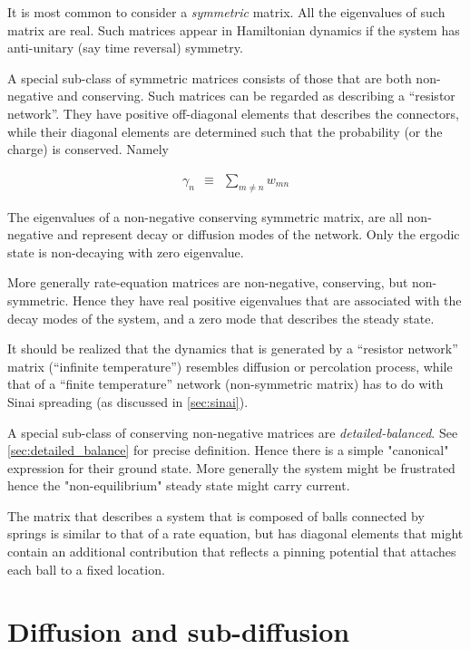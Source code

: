 It is most common to consider a {\em symmetric} matrix. 
All the eigenvalues of such matrix are real. 
Such matrices appear in Hamiltonian dynamics 
if the system has anti-unitary (say time reversal) symmetry.  

A special sub-class of symmetric matrices consists of those 
that are both non-negative and conserving. Such matrices
can be regarded as describing a ``resistor network''.
They have positive off-diagonal elements that describes 
the connectors, while their diagonal elements are determined 
such that the probability (or the charge) is conserved. Namely 

%
\begin{align}\label{eq:zero_sum}
\gamma_n \ \ \equiv \ \ \sum_{m\ne n} w_{mn}
\end{align}
%

The eigenvalues of a non-negative conserving symmetric matrix, 
are all non-negative and represent decay or diffusion modes of the network. 
Only the ergodic state is non-decaying with zero eigenvalue.   

More generally rate-equation matrices are non-negative, conserving, 
but non-symmetric. Hence they have real positive eigenvalues 
that are associated with the decay modes of the system, 
and a zero mode that describes the steady state.  

It should be realized that the dynamics that is generated 
by  a ``resistor network'' matrix (``infinite temperature'') 
resembles diffusion or percolation process, while that of 
a ``finite temperature'' network (non-symmetric matrix) has to 
do with Sinai spreading (as discussed in \autoref{sec:sinai}).  

A special sub-class of conserving non-negative matrices 
are {\em detailed-balanced}. See \autoref{sec:detailed_balance} for precise definition. 
Hence there is a simple "canonical" expression for their 
ground state. More generally the system might be frustrated 
hence the "non-equilibrium" steady state might carry current.

The matrix that describes a system that is composed 
of balls connected by springs is similar to that of a 
rate equation, but has diagonal elements that might contain 
an additional contribution that reflects a pinning potential 
that attaches each ball to a fixed location.   



\section{Diffusion and sub-diffusion}


